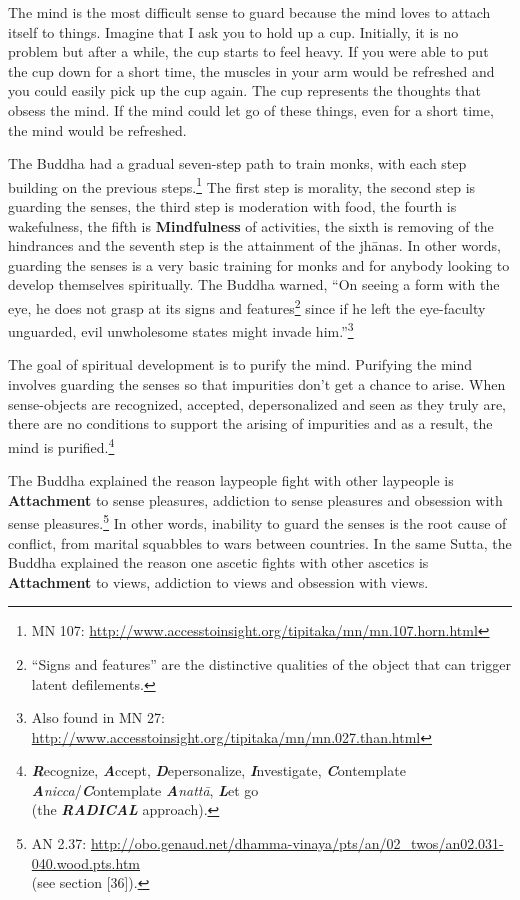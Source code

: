 The mind is the most difficult sense to guard because the mind loves to attach itself to things. Imagine that I ask you to hold up a cup. Initially, it is no problem but after a while, the cup starts to feel heavy. If you were able to put the cup down for a short time, the muscles in your arm would be refreshed and you could easily pick up the cup again. The cup represents the thoughts that obsess the mind. If the mind could let go of these things, even for a short time, the mind would be refreshed.

The Buddha had a gradual seven-step path to train monks, with each step building on the previous steps.\footnote{MN 107: \url{http://www.accesstoinsight.org/tipitaka/mn/mn.107.horn.html}} The first step is morality, the second step is guarding the senses, the third step is moderation with food, the fourth is wakefulness, the fifth is \textbf{Mindfulness} of activities, the sixth is removing of the hindrances and the seventh step is the attainment of the jhānas. In other words, guarding the senses is a very basic training for monks and for anybody looking to develop themselves spiritually. The Buddha warned, “On seeing a form with the eye, he does not grasp at its signs and features\footnote{“Signs and features” are the distinctive qualities of the object that can trigger latent defilements.} since if he left the eye-faculty unguarded, evil unwholesome states might invade him.”\footnote{Also found in MN 27: \url{http://www.accesstoinsight.org/tipitaka/mn/mn.027.than.html}}

\pagebreak

The goal of spiritual development is to purify the mind. Purifying the mind involves guarding the senses so that impurities don’t get a chance to arise. When sense-objects are recognized, accepted, depersonalized and seen as they truly are, there are no conditions to support the arising of impurities and as a result, the mind is purified.\footnote{\textit{\textbf{R}}ecognize, \textbf{\textit{A}}ccept, \textit{\textbf{D}}epersonalize, \textbf{\textit{I}}nvestigate, \textit{\textbf{C}}ontemplate \textbf{\textit{A}}\textit{nicca}/\textit{\textbf{C}}ontemplate \textbf{\textit{A}}\textit{nattā}, \textbf{\textit{L}}et go \\(the \textit{\textbf{RADICAL}} approach).}

The Buddha explained the reason laypeople fight with other laypeople is \textbf{Attachment} to sense pleasures, addiction to sense pleasures and obsession with sense pleasures.\footnote{AN 2.37: \url{http://obo.genaud.net/dhamma-vinaya/pts/an/02_twos/an02.031-040.wood.pts.htm}\\(see section [36]).} In other words, inability to guard the senses is the root cause of conflict, from marital squabbles to wars between countries. In the same Sutta, the Buddha explained the reason one ascetic fights with other ascetics is \textbf{Attachment} to views, addiction to views and obsession with views.

